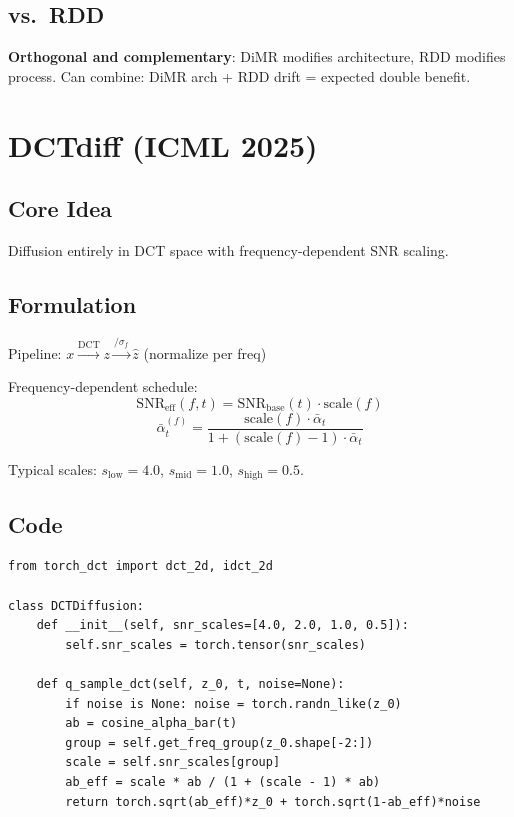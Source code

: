 \documentclass[11pt, a4paper]{article}
\newcommand{\alphabar}{\bar{\alpha}}
\begin{document}
\subsection{vs.\ RDD}

\textbf{Orthogonal and complementary}: DiMR modifies architecture, RDD modifies process. Can combine: DiMR arch + RDD drift = expected double benefit.

\newpage
\section{DCTdiff (ICML 2025)}

\subsection{Core Idea}
Diffusion entirely in DCT space with frequency-dependent SNR scaling.

\subsection{Formulation}

Pipeline: $x \xrightarrow{\mathrm{DCT}} z \xrightarrow{/\sigma_f} \hat{z}$ (normalize per freq)

Frequency-dependent schedule:
\begin{equation}
    \mathrm{SNR}_{\mathrm{eff}}(f,t) = \mathrm{SNR}_{\mathrm{base}}(t) \cdot \mathrm{scale}(f)
\end{equation}
\begin{equation}
    \alphabar_t^{(f)} = \frac{\mathrm{scale}(f) \cdot \alphabar_t}{1 + (\mathrm{scale}(f)-1)\cdot \alphabar_t}
\end{equation}

Typical scales: $s_{\mathrm{low}}=4.0$, $s_{\mathrm{mid}}=1.0$, $s_{\mathrm{high}}=0.5$.

\subsection{Code}

\begin{lstlisting}[caption={DCTdiff: Pipeline}]
from torch_dct import dct_2d, idct_2d

class DCTDiffusion:
    def __init__(self, snr_scales=[4.0, 2.0, 1.0, 0.5]):
        self.snr_scales = torch.tensor(snr_scales)

    def q_sample_dct(self, z_0, t, noise=None):
        if noise is None: noise = torch.randn_like(z_0)
        ab = cosine_alpha_bar(t)
        group = self.get_freq_group(z_0.shape[-2:])
        scale = self.snr_scales[group]
        ab_eff = scale * ab / (1 + (scale - 1) * ab)
        return torch.sqrt(ab_eff)*z_0 + torch.sqrt(1-ab_eff)*noise
\end{lstlisting}
\end{document}
